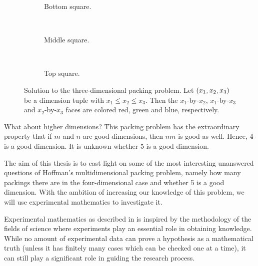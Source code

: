 \begin{figure}[ht]
    \centering
    \begin{subfigure}[b]{0.3\textwidth}
        \centering
            \begin{tikzpicture}[scale=0.2]
                
            \end{tikzpicture}
        \caption{Bottom square.}
        \label{fig:3d-special-square}
    \end{subfigure}
    ~
    \begin{subfigure}[b]{0.3\textwidth}
        \centering
            \begin{tikzpicture}[scale=0.2]
                
            \end{tikzpicture}
        \caption{Middle square.}
    \end{subfigure}
    ~
    \begin{subfigure}[b]{0.3\textwidth}
        \centering
            \begin{tikzpicture}[scale=0.2]
                
            \end{tikzpicture}
        \caption{Top square.}
    \end{subfigure}
    \caption{Solution to the three-dimensional packing problem. Let $\paren{x_1, x_2, x_3}$ be a dimension tuple with $x_1 \leq x_2 \leq x_3$. Then the $x_1$-by-$x_2$, $x_1$-by-$x_3$ and $x_2$-by-$x_3$ faces are colored red, green and blue, respectively.}
    \label{fig:universal-packing-3d}
\end{figure}

What about higher dimensions? This packing problem has the extraordinary property that if $m$ and $n$ are good dimensions, then $mn$ is good as well. Hence, 4 is a good dimension. It is unknown whether 5 is a good dimension.

The aim of this thesis is to cast light on some of the most interesting unanswered questions of Hoffman's multi\-dimensional packing problem, namely how many packings there are in the four-dimensional case and whether 5 is a good dimension. With the ambition of increasing our knowledge of this problem, we will use experimental mathematics to investigate it.

Experimental mathematics as described in \cite[p. 5-6]{eilers_johansen_2017} is inspired by the methodology of the fields of science where experiments play an essential role in obtaining knowledge. While no amount of experimental data can prove a hypothesis as a mathematical truth (unless it has finitely many cases which can be checked one at a time), it can still play a significant role in guiding the research process.


